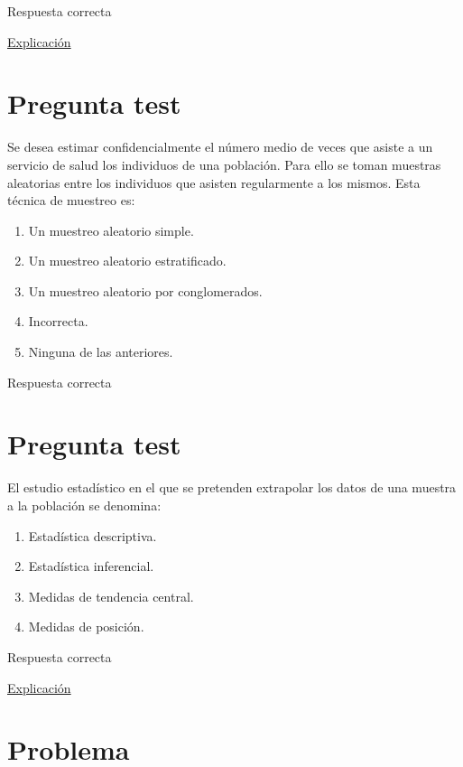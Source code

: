 \documentclass[
]{book}
\providecommand{\tightlist}{%
  \setlength{\itemsep}{0pt}\setlength{\parskip}{0pt}}
\begin{document}
Respuesta correcta

\href{https://es.wikipedia.org/wiki/Estudio_de_cohorte}{Explicación}

\hypertarget{pregunta-test-15}{%
\section{Pregunta test}\label{pregunta-test-15}}

Se desea estimar confidencialmente el número medio de veces que asiste a un servicio de salud los individuos de una población. Para ello se toman muestras aleatorias entre los individuos que asisten regularmente a los mismos. Esta técnica de muestreo es:

\begin{enumerate}
\def\labelenumi{\alph{enumi})}
\tightlist
\item
  Un muestreo aleatorio simple.
\item
  Un muestreo aleatorio estratificado.
\item
  Un muestreo aleatorio por conglomerados.
\item
  Incorrecta.
\item
  Ninguna de las anteriores.
\end{enumerate}

Respuesta correcta

\hypertarget{pregunta-test-16}{%
\section{Pregunta test}\label{pregunta-test-16}}

El estudio estadístico en el que se pretenden extrapolar los datos de una muestra a la población se denomina:

\begin{enumerate}
\def\labelenumi{\alph{enumi})}
\tightlist
\item
  Estadística descriptiva.
\item
  Estadística inferencial.
\item
  Medidas de tendencia central.
\item
  Medidas de posición.
\end{enumerate}

Respuesta correcta

\href{https://1fjmanzano.github.io/bioestadistica/inferencia-estad\%C3\%ADstica.html}{Explicación}

\hypertarget{problema-2}{%
\section{Problema}\label{problema-2}}
\end{document}
